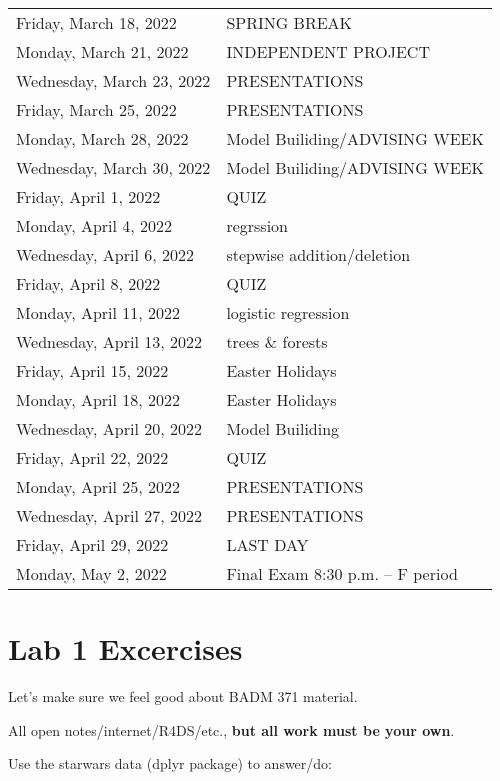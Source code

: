 \documentclass[
]{book}
\begin{document}
\begin{longtable}[]{@{}ll@{}}
Friday, March 18, 2022 & SPRING BREAK \\
Monday, March 21, 2022 & INDEPENDENT PROJECT \\
Wednesday, March 23, 2022 & PRESENTATIONS \\
Friday, March 25, 2022 & PRESENTATIONS \\
Monday, March 28, 2022 & Model Builiding/ADVISING WEEK \\
Wednesday, March 30, 2022 & Model Builiding/ADVISING WEEK \\
Friday, April 1, 2022 & QUIZ \\
Monday, April 4, 2022 & regrssion \\
Wednesday, April 6, 2022 & stepwise addition/deletion \\
Friday, April 8, 2022 & QUIZ \\
Monday, April 11, 2022 & logistic regression \\
Wednesday, April 13, 2022 & trees \& forests \\
Friday, April 15, 2022 & Easter Holidays \\
Monday, April 18, 2022 & Easter Holidays \\
Wednesday, April 20, 2022 & Model Builiding \\
Friday, April 22, 2022 & QUIZ \\
Monday, April 25, 2022 & PRESENTATIONS \\
Wednesday, April 27, 2022 & PRESENTATIONS \\
Friday, April 29, 2022 & LAST DAY \\
Monday, May 2, 2022 & Final Exam 8:30 p.m. -- F period \\
\bottomrule
\end{longtable}

\hypertarget{lab-1-excercises}{%
\chapter{Lab 1 Excercises}\label{lab-1-excercises}}

Let's make sure we feel good about BADM 371 material.

All open notes/internet/R4DS/etc., \textbf{but all work must be your own}.

Use the starwars data (dplyr package) to answer/do:
\end{document}
